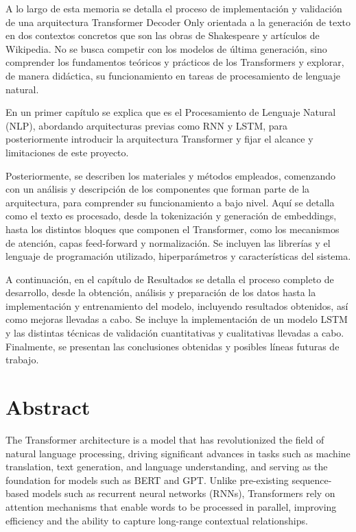 \documentclass[11pt]{book}
\newcommand{\clearemptydoublepage}{\newpage{\pagestyle{empty}\cleardoublepage}}
\begin{document}
A lo largo de esta memoria se detalla el proceso de implementación y validación de una arquitectura Transformer Decoder Only orientada a la generación de texto en dos contextos concretos que son las obras de Shakespeare y artículos de Wikipedia. No se busca competir con los modelos de última generación, sino comprender los fundamentos teóricos y prácticos de los Transformers y explorar, de manera didáctica, su funcionamiento en tareas de procesamiento de lenguaje natural.

En un primer capítulo se explica que es el Procesamiento de Lenguaje Natural (NLP), abordando arquitecturas previas como RNN y LSTM, para posteriormente introducir la arquitectura Transformer y fijar el alcance y limitaciones de este proyecto.

Posteriormente, se describen los materiales y métodos empleados, comenzando con un análisis y descripción de los componentes que forman parte de la arquitectura, para comprender su funcionamiento a bajo nivel. Aquí se detalla como el texto es procesado, desde la tokenización y generación de embeddings, hasta los distintos bloques que componen el Transformer, como los mecanismos de atención, capas feed-forward y normalización. Se incluyen las librerías y el lenguaje de programación utilizado, hiperparámetros y características del sistema.

A continuación, en el capítulo de Resultados se detalla el proceso completo de desarrollo, desde la obtención, análisis y preparación de los datos hasta la implementación y entrenamiento del modelo, incluyendo resultados obtenidos, así como mejoras llevadas a cabo. Se incluye la implementación de un modelo LSTM y las distintas técnicas de validación cuantitativas y cualitativas llevadas a cabo. Finalmente, se presentan las conclusiones obtenidas y posibles líneas futuras de trabajo.




\clearemptydoublepage

\chapter{Abstract}
The Transformer architecture is a model that has revolutionized the field of natural language processing, driving significant advances in tasks such as machine translation, text generation, and language understanding, and serving as the foundation for models such as BERT and GPT. Unlike pre-existing sequence-based models such as recurrent neural networks (RNNs), Transformers rely on attention mechanisms that enable words to be processed in parallel, improving efficiency and the ability to capture long-range contextual relationships.
\end{document}

